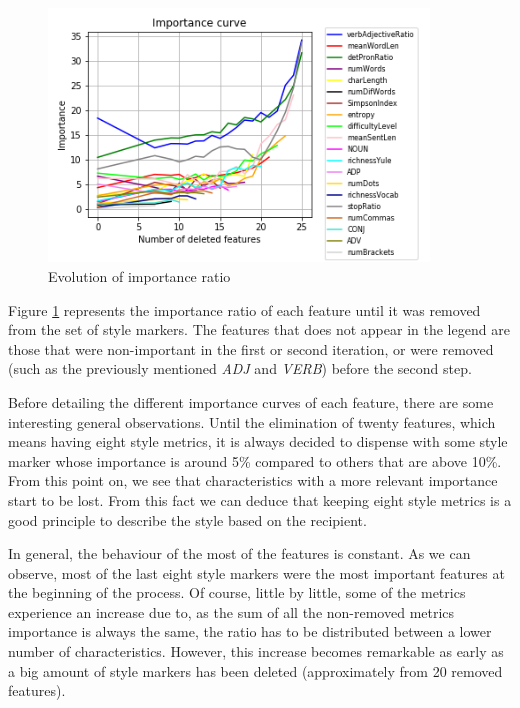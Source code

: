 \begin{figure}
	\centering%
	\centerline{\includegraphics[width=0.9\textwidth]{Imagenes/Bitmap/DecisionTrees/limportancecurve.png}}%
	\caption{Evolution of importance ratio}%
	\label{fig:impcurv}
\end{figure}

Figure \ref{fig:impcurv} represents the importance ratio of each feature until it was removed from the set of style markers. The features that does not appear in the legend are those that were non-important in the first or second iteration, or were removed (such as the previously mentioned \textit{ADJ} and \textit{VERB}) before the second step.

Before detailing the different importance curves of each feature, there are some interesting general observations. Until the elimination of twenty features, which means having eight style metrics, it is always decided to dispense with some style marker whose importance is around 5\% compared to others that are above 10\%. From this point on, we see that characteristics with a more relevant importance start to be lost. From this fact we can deduce that keeping eight style metrics is a good principle to describe the style based on the recipient.

In general, the behaviour of the most of the features is constant. As we can observe, most of the last eight style markers were the most important features at the beginning of the process. Of course, little by little, some of the metrics experience an increase due to, as the sum of all the non-removed metrics importance is always the same, the ratio has to be distributed between a lower number of characteristics. However, this increase becomes remarkable as early as a big amount of style markers has been deleted (approximately from 20 removed features).

